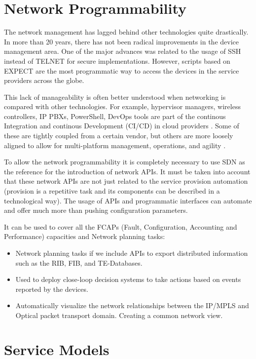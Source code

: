 \documentclass[a4paper,fleqn]{cas-dc}
\begin{document}
\section{Network Programmability}
\label{section:net}

The network management has lagged behind other technologies quite drastically. In more than 20 years, there has not been radical improvements in the device management area. One of the major advances was related to the usage of SSH instead of TELNET for secure implementations. However, scripts based on EXPECT are the most programmatic way to access the devices in the service providers across the globe.

This lack of manageability is often better understood when networking is compared with other technologies. For example, hypervisor managers, wireless controllers, IP PBXs, PowerShell, DevOps tools are part of the continous Integration and continous Development (CI/CD) in cloud providers \cite{mittal2017cloud,demchenko2016zerotouch}. Some of these are tightly coupled from a certain vendor, but others are more loosely aligned to allow for multi-platform management, operations, and agility \cite{edelman2018network}.

To allow the network programmability it is completely necessary to use SDN as the reference for the introduction of network APIs. It must be taken into account that these network APIs are not just related to the service provision automation (provision is a repetitive task and its components can be described in a technological way). The usage of APIs and programmatic interfaces can automate and offer much more than pushing configuration parameters. 

It can be used to cover all the FCAPs (Fault, Configuration, Accounting and Performance) capacities and Network planning tasks:
\begin{itemize}
    \item Network planning tasks if we include APIs to export distributed information such as the RIB, FIB, and TE-Databases.
    \item Used to deploy close-loop decision systems to take actions based on events reported by the devices.
    \item Automatically visualize the network relationships between the IP/MPLS and Optical packet transport domain. Creating a common network view. 
\end{itemize}

\section{Service Models}
\label{section:models}
\end{document}
